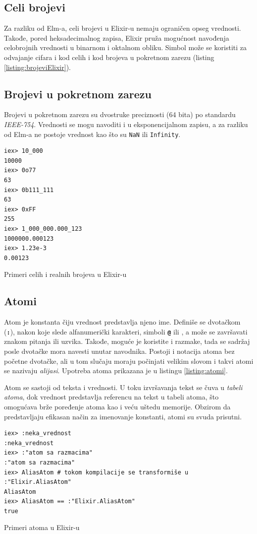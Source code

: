 \documentclass[12pt,oneside]{memoir}
\begin{document}
\subsection{Celi brojevi}
Za razliku od Elm-a, celi brojevi u Elixir-u nemaju ograničen opseg vrednosti. Takođe, pored
heksadecimalnog zapisa, Elixir pruža mogućnost navođenja celobrojnih vrednosti u binarnom i 
oktalnom obliku. Simbol \texttt{\textbf{\textunderscore}} može se koristiti za odvajanje 
cifara i kod celih i kod brojeva u pokretnom zarezu (listing \ref{listing:brojeviElixir}).
\subsection{Brojevi u pokretnom zarezu}
Brojevi u pokretnom zarezu su dvostruke preciznosti (64 bita) po standardu \emph{IEEE-754}.
Vrednosti se mogu navoditi i u eksponencijalnom zapisu, a za razliku od Elm-a ne postoje 
vrednost kao što su \texttt{NaN} ili \texttt{Infinity}.
\begin{listing}[!h]
\begin{verbatim}
iex> 10_000
10000
iex> 0o77
63
iex> 0b111_111
63
iex> 0xFF
255
iex> 1_000_000.000_123
1000000.000123
iex> 1.23e-3
0.00123
\end{verbatim}
\caption{Primeri celih i realnih brojeva u Elixir-u}
\label{listing:brojeviElixir}
\end{listing}
\subsection{Atomi}
Atom je konstanta čiju vrednost predstavlja njeno ime. Definiše se dvotačkom (\texttt{\textbf{:}}),
nakon koje slede alfanumerički karakteri, simboli \texttt{\textbf{@}} ili 
\texttt{\textbf{\textunderscore}}, a može se završavati znakom pitanja ili uzvika. Takođe, moguće
je koristite i razmake, tada se sadržaj posle dvotačke mora navesti unutar navodnika.
Postoji i notacija atoma bez početne dvotačke, ali u tom slučaju moraju počinjati velikim
slovom i takvi atomi se nazivaju \emph{alijasi}. Upotreba atoma prikazana je u listingu
\ref{listing:atomi}.

Atom se sastoji od teksta i vrednosti. U toku izvršavanja tekst se čuva u \emph{tabeli atoma},
dok vrednost predstavlja referencu na tekst u tabeli atoma, što omogućava brže poređenje atoma
kao i veću uštedu memorije. Obzirom da predstavljaju efikasan način za imenovanje konstanti,
atomi su svuda prisutni.
\begin{listing}[!h]
\begin{verbatim}
iex> :neka_vrednost
:neka_vrednost
iex> :"atom sa razmacima"
:"atom sa razmacima"
iex> AliasAtom # tokom kompilacije se transformiše u :"Elixir.AliasAtom"
AliasAtom
iex> AliasAtom == :"Elixir.AliasAtom"
true
\end{verbatim}
\caption{Primeri atoma u Elixir-u}
\label{listing:atomi}
\end{listing}
\end{document}
